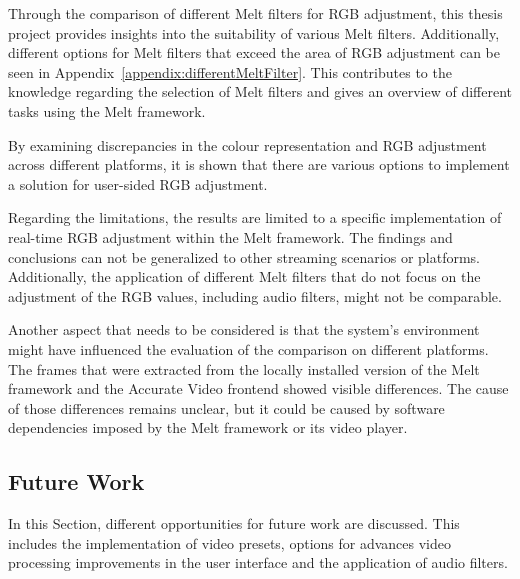 \documentclass[../MasterThesis.tex]{subfiles}
\begin{document}
Through the comparison of different Melt filters for RGB adjustment, this thesis project provides insights into the suitability of various Melt filters. Additionally, different options for Melt filters that exceed the area of RGB adjustment can be seen in Appendix~\ref{appendix:differentMeltFilter}.
This contributes to the knowledge regarding the selection of Melt filters and gives an overview of different tasks using the Melt framework.


By examining discrepancies in the colour representation and RGB adjustment across different platforms, it is shown that there are various options to implement a solution for user-sided RGB adjustment.


Regarding the limitations, the results are limited to a specific implementation of real-time RGB adjustment within the Melt framework. The findings and conclusions can not be generalized to other streaming scenarios or platforms. 
Additionally, the application of different Melt filters that do not focus on the adjustment of the RGB values, including audio filters, might not be comparable. 


Another aspect that needs to be considered is that the system's environment might have influenced the evaluation of the comparison on different platforms. The frames that were extracted from the locally installed version of the Melt framework and the Accurate Video frontend showed visible differences. The cause of those differences remains unclear, but it could be caused by software dependencies imposed by the Melt framework or its video player.

	

	
	
	
	





\subsection{Future Work} \label{subsection:futurework}


In this Section, different opportunities for future work are discussed. This includes the implementation of video presets, options for advances video processing improvements in the user interface and the application of audio filters.
\end{document}

